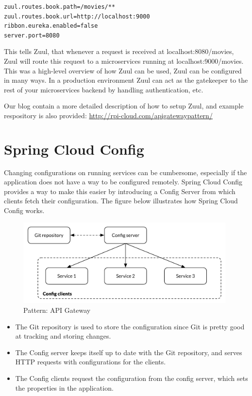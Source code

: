 \begin{lstlisting}
zuul.routes.book.path=/movies/**  
zuul.routes.book.url=http://localhost:9000  
ribbon.eureka.enabled=false  
server.port=8080  
\end{lstlisting}

\noindent This tells Zuul, that whenever a request is received at localhost:8080/movies, Zuul will route this request to a microservices running at localhost:9000/movies. \\

\noindent This was a high-level overview of how Zuul can be used, Zuul can be configured in many ways. In a production environment Zuul can act as the gatekeeper to the rest of your microservices backend by handling authentication, etc. 

\noindent Our blog contain a more detailed description of how to setup Zuul, and example respository is also provided: \url{http://rpi-cloud.com/apigatewaypattern/}

\section*{Spring Cloud Config}

Changing configurations on running services can be cumbersome, especially if the application does not have a way to be configured remotely. Spring Cloud Config provides a way to make this easier by introducing a Config Server from which clients fetch their configuration. The figure below illustrates how Spring Cloud Config works.

\begin{figure}[H]
	\centering
	\includegraphics[width=11cm]{figures/config_server}
	\caption{Pattern: API Gateway}
	\label{fig:api_gateway}
\end{figure}

\begin{itemize}
  \item The Git repository is used to store the configuration since Git is pretty good at tracking and storing changes.
  \item The Config server keeps itself up to date with the Git repository, and serves HTTP requests with configurations for the clients.
  \item The Config clients request the configuration from the config server, which sets the properties in the application.
\end{itemize}

